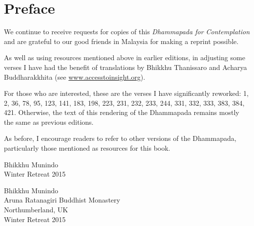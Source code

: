 
\chapter[Preface to the fourth edition (2015)]{Preface}

We continue to receive requests for copies of this \emph{Dhammapada for
Contemplation} and are grateful to our good friends in Malaysia for making a
reprint possible.

As well as using resources mentioned above in earlier editions, in adjusting
some verses I have had the benefit of translations by Bhikkhu Thanissaro and
Acharya Buddharakkhita (see
\href{http://accesstoinsight.org}{www.accesstoinsight.org}).

For those who are interested, these are the verses I have significantly
reworked: 1, 2, 36, 78, 95, 123, 141, 183, 198, 223, 231, 232, 233, 244, 331,
332, 333, 383, 384, 421. Otherwise, the text of this rendering of the Dhammapada
remains mostly the same as previous editions.

As before, I encourage readers to refer to other versions of the Dhammapada,
particularly those mentioned as resources for this book.

\ifpocketversion

\enlargethispage{\baselineskip}

{\raggedleft
Bhikkhu Munindo\\
Winter Retreat 2015
\par}

\else

{\raggedleft
Bhikkhu Munindo\\
Aruna Ratanagiri Buddhist Monastery\\
Northumberland, UK\\
Winter Retreat 2015
\par}

\fi

